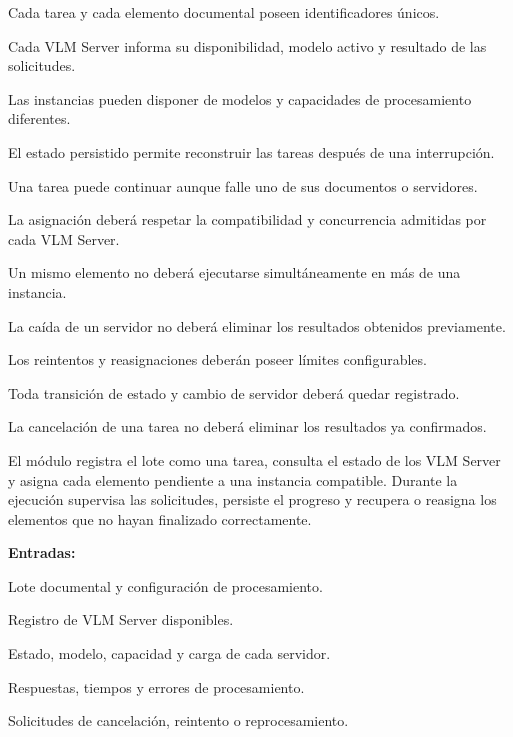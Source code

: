 \begin{definicionmodulo}
\item[Supuestos]
\begin{elementosmodulo}
    \item Cada tarea y cada elemento documental poseen identificadores únicos.
    \item Cada VLM Server informa su disponibilidad, modelo activo y resultado de las solicitudes.
    \item Las instancias pueden disponer de modelos y capacidades de procesamiento diferentes.
    \item El estado persistido permite reconstruir las tareas después de una interrupción.
    \item Una tarea puede continuar aunque falle uno de sus documentos o servidores.
\end{elementosmodulo}

\item[Restricciones]
\begin{elementosmodulo}
    \item La asignación deberá respetar la compatibilidad y concurrencia admitidas por cada VLM Server.
    \item Un mismo elemento no deberá ejecutarse simultáneamente en más de una instancia.
    \item La caída de un servidor no deberá eliminar los resultados obtenidos previamente.
    \item Los reintentos y reasignaciones deberán poseer límites configurables.
    \item Toda transición de estado y cambio de servidor deberá quedar registrado.
    \item La cancelación de una tarea no deberá eliminar los resultados ya confirmados.
\end{elementosmodulo}

\item[Estructura general] El módulo registra el lote como una tarea, consulta el estado de los VLM Server y asigna cada elemento pendiente a una instancia compatible. Durante la ejecución supervisa las solicitudes, persiste el progreso y recupera o reasigna los elementos que no hayan finalizado correctamente.

\textbf{Entradas:}
\begin{elementosmodulo}
    \item Lote documental y configuración de procesamiento.
    \item Registro de VLM Server disponibles.
    \item Estado, modelo, capacidad y carga de cada servidor.
    \item Respuestas, tiempos y errores de procesamiento.
    \item Solicitudes de cancelación, reintento o reprocesamiento.
\end{elementosmodulo}


\end{definicionmodulo}
